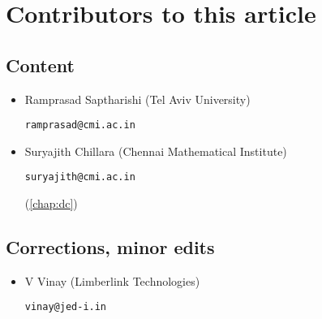 \chapter*{Contributors to this article}

\section*{Content}

\begin{itemize}
\item Ramprasad Saptharishi (Tel Aviv University)

\texttt{ramprasad@cmi.ac.in}

\item Suryajith Chillara (Chennai Mathematical Institute)

\texttt{suryajith@cmi.ac.in}

{\small (\autoref{chap:dc})}

\end{itemize}

\section*{Corrections, minor edits}

\begin{itemize}
\item V Vinay (Limberlink Technologies)

\texttt{vinay@jed-i.in}
\end{itemize}


